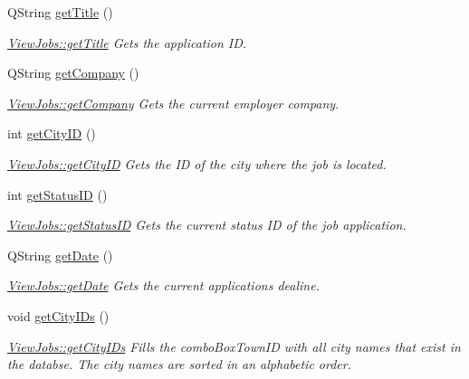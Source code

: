 \begin{DoxyCompactItemize}
Q\+String \hyperlink{class_view_jobs_ae78f119d37c77a9e3e457ecfd78d7de3}{get\+Title} ()
\begin{DoxyCompactList}\small\item\em \hyperlink{class_view_jobs_ae78f119d37c77a9e3e457ecfd78d7de3}{View\+Jobs\+::get\+Title} Gets the application ID. \end{DoxyCompactList}\item 
Q\+String \hyperlink{class_view_jobs_a88d7c0a7a79bc7a7e02b524587983bf8}{get\+Company} ()
\begin{DoxyCompactList}\small\item\em \hyperlink{class_view_jobs_a88d7c0a7a79bc7a7e02b524587983bf8}{View\+Jobs\+::get\+Company} Gets the current employer company. \end{DoxyCompactList}\item 
int \hyperlink{class_view_jobs_adcafeca350b21a033aa630e042ee7947}{get\+City\+ID} ()
\begin{DoxyCompactList}\small\item\em \hyperlink{class_view_jobs_adcafeca350b21a033aa630e042ee7947}{View\+Jobs\+::get\+City\+ID} Gets the ID of the city where the job is located. \end{DoxyCompactList}\item 
int \hyperlink{class_view_jobs_a91696fde9f0a663bae929390aac8324b}{get\+Status\+ID} ()
\begin{DoxyCompactList}\small\item\em \hyperlink{class_view_jobs_a91696fde9f0a663bae929390aac8324b}{View\+Jobs\+::get\+Status\+ID} Gets the current status ID of the job application. \end{DoxyCompactList}\item 
Q\+String \hyperlink{class_view_jobs_af046f9201cc6031e070b4f9b613a35f9}{get\+Date} ()
\begin{DoxyCompactList}\small\item\em \hyperlink{class_view_jobs_af046f9201cc6031e070b4f9b613a35f9}{View\+Jobs\+::get\+Date} Gets the current application\textquotesingle{}s dealine. \end{DoxyCompactList}\item 
\mbox{\label{class_view_jobs_a6cf031afcc4a09dfca54044fdf8c4f7b}} 
void \hyperlink{class_view_jobs_a6cf031afcc4a09dfca54044fdf8c4f7b}{get\+City\+I\+Ds} ()
\begin{DoxyCompactList}\small\item\em \hyperlink{class_view_jobs_a6cf031afcc4a09dfca54044fdf8c4f7b}{View\+Jobs\+::get\+City\+I\+Ds} Fills the combo\+Box\+Town\+ID with all city names that exist in the databse. The city names are sorted in an alphabetic order. \end{DoxyCompactList}\item 

\end{DoxyCompactItemize}
